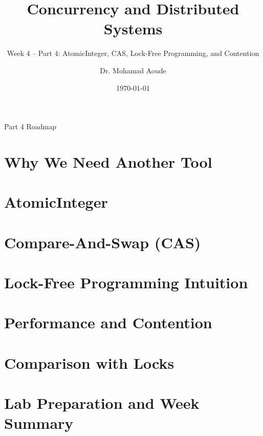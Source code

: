 \documentclass[aspectratio=169,11pt]{beamer}
\title[Week 4 -- Part 4]{Concurrency and Distributed Systems}
\subtitle{Week 4 -- Part 4: AtomicInteger, CAS, Lock-Free Programming, and Contention}
\author{Dr. Mohamad Aoude}
\institute{Faculty of Engineering}
\date{\today}
\begin{document}
	
	\begin{frame}
		\titlepage
	\end{frame}
	
	\begin{frame}{Part 4 Roadmap}
		\tableofcontents
	\end{frame}
	
	\section{Why We Need Another Tool}
	\section{AtomicInteger}
	\section{Compare-And-Swap (CAS)}
	\section{Lock-Free Programming Intuition}
	\section{Performance and Contention}
	\section{Comparison with Locks}
	\section{Lab Preparation and Week Summary}
	
\end{document}
